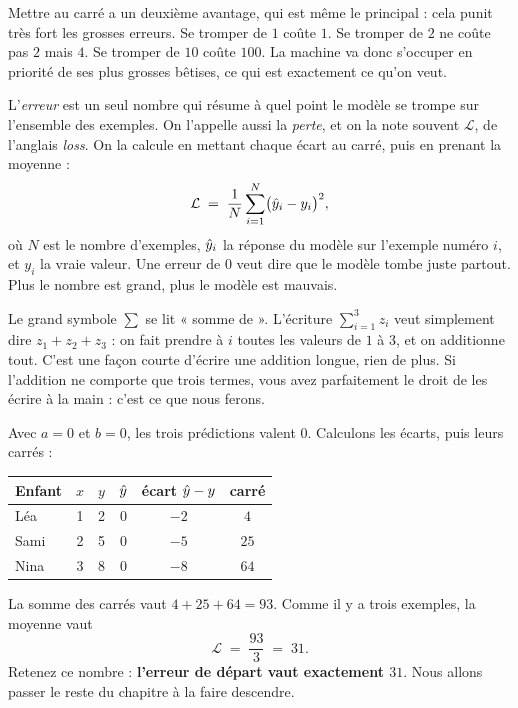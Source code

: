 \begin{intuition}
Mettre au carré a un deuxième avantage, qui est même le principal : cela
punit très fort les grosses erreurs. Se tromper de $1$ coûte $1$. Se tromper
de $2$ ne coûte pas $2$ mais $4$. Se tromper de $10$ coûte $100$. La machine
va donc s'occuper en priorité de ses plus grosses bêtises, ce qui est
exactement ce qu'on veut.
\end{intuition}

\begin{definition}
L'\emph{erreur} est un seul nombre qui résume à quel point le modèle se
trompe sur l'ensemble des exemples. On l'appelle aussi la \emph{perte}, et
on la note souvent $\mathcal{L}$, de l'anglais \emph{loss}. On la calcule en
mettant chaque écart au carré, puis en prenant la moyenne :
\[
  \mathcal{L} \;=\; \frac{1}{N}\sum_{i=1}^{N}
                    \bigl(\hat{y}_i - y_i\bigr)^{2},
\]
où $N$ est le nombre d'exemples, $\hat{y}_i$ la réponse du modèle sur
l'exemple numéro $i$, et $y_i$ la vraie valeur. Une erreur de $0$ veut dire
que le modèle tombe juste partout. Plus le nombre est grand, plus le modèle
est mauvais.
\end{definition}

\begin{notation}
Le grand symbole $\sum$ se lit « somme de ». L'écriture
$\sum_{i=1}^{3} z_i$ veut simplement dire $z_1 + z_2 + z_3$ : on fait
prendre à $i$ toutes les valeurs de $1$ à $3$, et on additionne tout. C'est
une façon courte d'écrire une addition longue, rien de plus. Si l'addition
ne comporte que trois termes, vous avez parfaitement le droit de les écrire
à la main : c'est ce que nous ferons.
\end{notation}

\begin{exemple}
Avec $a = 0$ et $b = 0$, les trois prédictions valent $0$. Calculons les
écarts, puis leurs carrés :

\begin{center}
\begin{tabular}{lccccc}
\toprule
\textbf{Enfant} & $x$ & $y$ & $\hat{y}$ & \textbf{écart } $\hat{y}-y$
& \textbf{carré} \\
\midrule
Léa  & 1 & 2 & 0 & $-2$ & $4$  \\
Sami & 2 & 5 & 0 & $-5$ & $25$ \\
Nina & 3 & 8 & 0 & $-8$ & $64$ \\
\bottomrule
\end{tabular}
\end{center}

La somme des carrés vaut $4 + 25 + 64 = 93$. Comme il y a trois exemples, la
moyenne vaut
\[
  \mathcal{L} \;=\; \frac{93}{3} \;=\; 31 .
\]
Retenez ce nombre : \textbf{l'erreur de départ vaut exactement $31$}. Nous
allons passer le reste du chapitre à la faire descendre.
\end{exemple}

